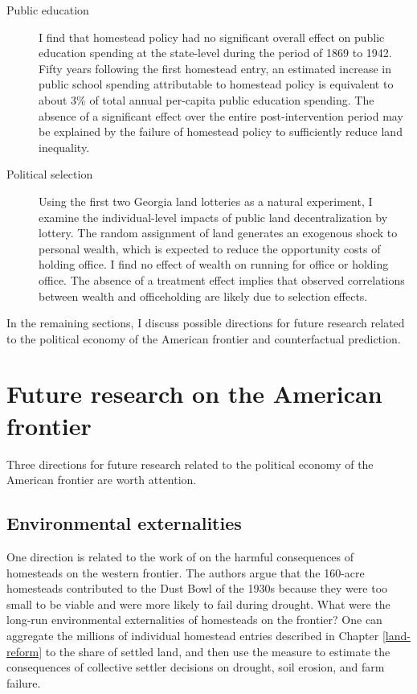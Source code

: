 \begin{description}
	\item[Public education] I find that homestead policy had no significant overall effect on public education spending at the state-level during the period of 1869 to 1942. Fifty years following the first homestead entry, an estimated increase in public school spending attributable to homestead policy is equivalent to about 3\% of total annual per-capita public education spending. The absence of a significant effect over the entire post-intervention period may be explained by the failure of homestead policy to sufficiently reduce land inequality. 
	
	\item[Political selection] Using the first two Georgia land lotteries as a natural experiment, I examine the individual-level impacts of public land decentralization by lottery. The random assignment of land generates an exogenous shock to personal wealth, which is expected to reduce the opportunity costs of holding office. I find no effect of wealth on running for office or holding office. The absence of a treatment effect implies that observed  correlations between wealth and officeholding are likely due to selection effects.
	
\end{description}

In the remaining sections, I discuss possible directions for future research related to the political economy of the American frontier and counterfactual prediction. 

\section{Future research on the American frontier}

Three directions for future research related to the political economy of the American frontier are worth attention. 

\subsection{Environmental externalities} One direction is related to the work of \citet{hansen2001us} on the harmful consequences of homesteads on the western frontier. The authors argue that the 160-acre homesteads contributed to the Dust Bowl of the 1930s because they were too small to be viable and were more likely to fail during drought. What were the long-run environmental externalities of homesteads on the frontier? One can aggregate the millions of individual homestead entries described in Chapter \ref{land-reform} to the share of settled land, and then use the measure to estimate the consequences of collective settler decisions on drought, soil erosion, and farm failure. 

